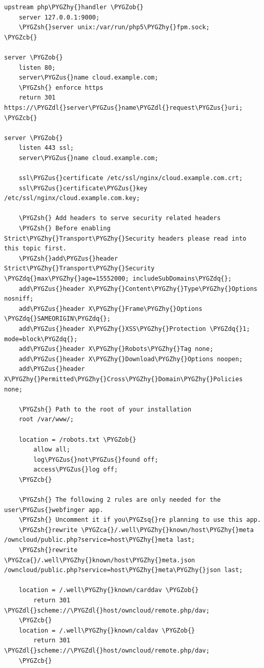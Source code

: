 \documentclass[letterpaper,10pt,english]{sphinxmanual}
\def\PYGZus{\char`\_}
\def\PYGZob{\char`\{}
\def\PYGZcb{\char`\}}
\def\PYGZca{\char`\^}
\def\PYGZsh{\char`\#}
\def\PYGZdl{\char`\$}
\def\PYGZhy{\char`\-}
\def\PYGZsq{\char`\'}
\def\PYGZdq{\char`\"}
\renewcommand\PYGZsq{\textquotesingle}
\begin{document}
\begin{Verbatim}[commandchars=\\\{\}]
upstream php\PYGZhy{}handler \PYGZob{}
    server 127.0.0.1:9000;
    \PYGZsh{}server unix:/var/run/php5\PYGZhy{}fpm.sock;
\PYGZcb{}

server \PYGZob{}
    listen 80;
    server\PYGZus{}name cloud.example.com;
    \PYGZsh{} enforce https
    return 301 https://\PYGZdl{}server\PYGZus{}name\PYGZdl{}request\PYGZus{}uri;
\PYGZcb{}

server \PYGZob{}
    listen 443 ssl;
    server\PYGZus{}name cloud.example.com;

    ssl\PYGZus{}certificate /etc/ssl/nginx/cloud.example.com.crt;
    ssl\PYGZus{}certificate\PYGZus{}key /etc/ssl/nginx/cloud.example.com.key;

    \PYGZsh{} Add headers to serve security related headers
    \PYGZsh{} Before enabling Strict\PYGZhy{}Transport\PYGZhy{}Security headers please read into this topic first.
    \PYGZsh{}add\PYGZus{}header Strict\PYGZhy{}Transport\PYGZhy{}Security \PYGZdq{}max\PYGZhy{}age=15552000; includeSubDomains\PYGZdq{};
    add\PYGZus{}header X\PYGZhy{}Content\PYGZhy{}Type\PYGZhy{}Options nosniff;
    add\PYGZus{}header X\PYGZhy{}Frame\PYGZhy{}Options \PYGZdq{}SAMEORIGIN\PYGZdq{};
    add\PYGZus{}header X\PYGZhy{}XSS\PYGZhy{}Protection \PYGZdq{}1; mode=block\PYGZdq{};
    add\PYGZus{}header X\PYGZhy{}Robots\PYGZhy{}Tag none;
    add\PYGZus{}header X\PYGZhy{}Download\PYGZhy{}Options noopen;
    add\PYGZus{}header X\PYGZhy{}Permitted\PYGZhy{}Cross\PYGZhy{}Domain\PYGZhy{}Policies none;

    \PYGZsh{} Path to the root of your installation
    root /var/www/;

    location = /robots.txt \PYGZob{}
        allow all;
        log\PYGZus{}not\PYGZus{}found off;
        access\PYGZus{}log off;
    \PYGZcb{}

    \PYGZsh{} The following 2 rules are only needed for the user\PYGZus{}webfinger app.
    \PYGZsh{} Uncomment it if you\PYGZsq{}re planning to use this app.
    \PYGZsh{}rewrite \PYGZca{}/.well\PYGZhy{}known/host\PYGZhy{}meta /owncloud/public.php?service=host\PYGZhy{}meta last;
    \PYGZsh{}rewrite \PYGZca{}/.well\PYGZhy{}known/host\PYGZhy{}meta.json /owncloud/public.php?service=host\PYGZhy{}meta\PYGZhy{}json last;

    location = /.well\PYGZhy{}known/carddav \PYGZob{}
        return 301 \PYGZdl{}scheme://\PYGZdl{}host/owncloud/remote.php/dav;
    \PYGZcb{}
    location = /.well\PYGZhy{}known/caldav \PYGZob{}
        return 301 \PYGZdl{}scheme://\PYGZdl{}host/owncloud/remote.php/dav;
    \PYGZcb{}


\end{Verbatim}
\end{document}
